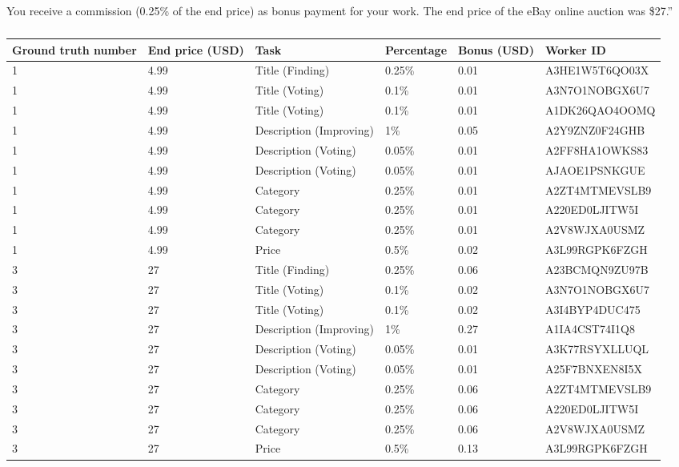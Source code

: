 You receive a commission (0.25\% of the end price) as bonus payment for your work. The end price of the eBay online auction was \$27.''
\begin{table}[h!]
	\begin{center}
	\begin{tabular}{| p{1cm} | p{1.5cm} | p{3cm} | p{1.5cm} | p{1.5cm} | p{3.5cm} |}
		\hline
		Ground truth number & End price (USD) & Task & Percentage & Bonus (USD) & Worker ID \\
		\hline
		1 & 4.99 & Title (Finding) & 0.25\% & 0.01 & A3HE1W5T6QO03X \\
		\hline
		1 & 4.99 & Title (Voting) & 0.1\% & 0.01 & A3N7O1NOBGX6U7 \\
		\hline
		1 & 4.99 & Title (Voting) & 0.1\% & 0.01 & A1DK26QAO4OOMQ \\
		\hline
		1 & 4.99 & Description (Improving) & 1\% & 0.05 & A2Y9ZNZ0F24GHB \\
		\hline
		1 & 4.99 & Description (Voting) & 0.05\% & 0.01 & A2FF8HA1OWKS83 \\
		\hline
		1 & 4.99 & Description (Voting) & 0.05\% & 0.01 & AJAOE1PSNKGUE \\
		\hline
		1 & 4.99 & Category & 0.25\% & 0.01 & A2ZT4MTMEVSLB9 \\
		\hline
		1 & 4.99 & Category & 0.25\% & 0.01 & A220ED0LJITW5I \\
		\hline
		1 & 4.99 & Category & 0.25\% & 0.01 & A2V8WJXA0USMZ \\
		\hline
		1 & 4.99 & Price & 0.5\% & 0.02 & A3L99RGPK6FZGH \\
		\hline
		3 & 27 & Title (Finding) & 0.25\% & 0.06 & A23BCMQN9ZU97B \\
		\hline
		3 & 27 & Title (Voting) & 0.1\% & 0.02 & A3N7O1NOBGX6U7 \\
		\hline
		3 & 27 & Title (Voting) & 0.1\% & 0.02 & A3I4BYP4DUC475 \\
		\hline
		3 & 27 & Description (Improving) & 1\% & 0.27 & A1IA4CST74I1Q8 \\
		\hline
		3 & 27 & Description (Voting) & 0.05\% & 0.01 & A3K77RSYXLLUQL \\
		\hline
		3 & 27 & Description (Voting) & 0.05\% & 0.01 & A25F7BNXEN8I5X \\
		\hline
		3 & 27 & Category & 0.25\% & 0.06 & A2ZT4MTMEVSLB9 \\
		\hline
		3 & 27 & Category & 0.25\% & 0.06 & A220ED0LJITW5I \\
		\hline
		3 & 27 & Category & 0.25\% & 0.06 & A2V8WJXA0USMZ \\
		\hline
		3 & 27 & Price & 0.5\% & 0.13 & A3L99RGPK6FZGH \\
		\hline
	\end{tabular}
	\end{center}
	\caption{}
\end{table}



